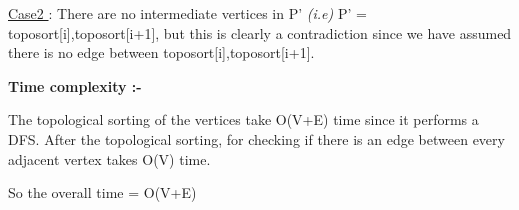 \documentclass[12pt]{article}
\begin{document}
\begin{enumerate}
    \underline{Case2 }:
    There are no intermediate vertices in P' \textit{(i.e)} P' = {toposort[i],toposort[i+1]}, but this is clearly a contradiction since we have assumed there is no edge between toposort[i],toposort[i+1].
    
    \textbf{Time complexity :-}
    
    The topological sorting of the vertices take O(V+E) time since it performs a DFS. After the topological sorting, for checking if there is an edge between every adjacent vertex takes O(V) time.
    
    So the overall time = O(V+E)
\end{enumerate}
\end{document}
